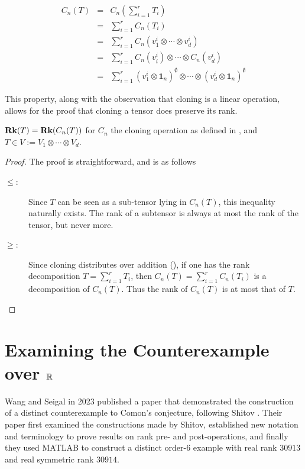 \documentclass[../Lael_John_MasterThesis_Draft.tex]{subfiles}
\begin{document}
\begin{eqnarray*}
    C_n(T) &=& C_n\left(\sum_{i=1}^{r} T_i\right)\\
    &=& \sum_{i=1}^{r} C_n(T_i)\\
    &=& \sum_{i=1}^{r} C_n(v^i_1 \otimes \cdots \otimes v^i_d)\\
    &=& \sum_{i=1}^{r} C_n(v^i_i) \otimes \cdots \otimes C_n(v^i_d)\\
    &=& \sum_{i=1}^{r} (v^i_1 \otimes \mathbf{1}_n)^{\emptyset} \otimes \cdots \otimes (v^i_d \otimes \mathbf{1}_n)^{\emptyset}
\end{eqnarray*}
\begin{remark}
    This property, along with the observation that cloning is a linear operation, allows for the proof that cloning a tensor does preserve its rank.
\end{remark} 
\begin{proposition}\label{proposition:cloningpreservesrank}
    $\textbf{Rk}(T) = \textbf{Rk}(C_n(T))$ for $C_n$ the cloning operation as defined in , and $T \in V:= V_1 \otimes \cdots \otimes V_d$.
\end{proposition} 
\begin{proof}The proof is straightforward, and is as follows
    \begin{description}
        \item[$\leq$:] Since $T$ can be seen as a sub-tensor lying in $C_n(T)$, this inequality naturally exists. The rank of a subtensor is always at most the rank of the tensor, but never more.
        \item[$\geq$:] Since cloning distributes over addition (), if  one has the rank decomposition $T = \sum_{i=1}^{r} T_i$, then $C_n(T) = \sum_{i=1}^{r} C_n(T_i)$ is a decomposition of $C_n(T)$. Thus the rank of $C_n(T)$ is at most that of $T$.  
    \end{description}
\end{proof}
\section{Examining the Counterexample over $\mathbb{R}$}\label{section:seigalcounterexample}
Wang and Seigal \cite{wang_lower_2023} in 2023 published a paper that demonstrated the construction of a distinct counterexample to Comon's conjecture, following Shitov \cite{shitov_comons_2020}. Their paper first examined the constructions made by Shitov, established new notation and terminology to prove results on rank pre- and post-operations, and finally they used MATLAB to construct a distinct order-$6$ example with real rank $30913$ and real symmetric rank $30914$.
\end{document}
